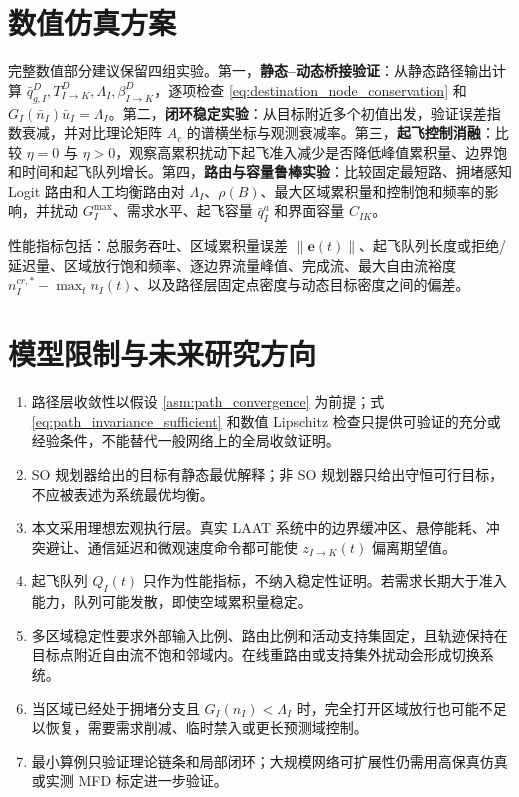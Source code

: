 \documentclass[a4paper,12pt]{article}
\theoremstyle{plain}
\theoremstyle{definition}
\theoremstyle{remark}
\begin{document}
\section{数值仿真方案}

完整数值部分建议保留四组实验。第一，\textbf{静态--动态桥接验证}：从静态路径输出计算 $\bar q_{g,I}^D,T_{I\to K}^D,\Lambda_I,\beta_{I\to K}^D$，逐项检查 \eqref{eq:destination_node_conservation} 和 $G_I(\bar n_I)\bar u_I=\Lambda_I$。第二，\textbf{闭环稳定实验}：从目标附近多个初值出发，验证误差指数衰减，并对比理论矩阵 $A_c$ 的谱横坐标与观测衰减率。第三，\textbf{起飞控制消融}：比较 $\eta=0$ 与 $\eta>0$，观察高累积扰动下起飞准入减少是否降低峰值累积量、边界饱和时间和起飞队列增长。第四，\textbf{路由与容量鲁棒实验}：比较固定最短路、拥堵感知 Logit 路由和人工均衡路由对 $\Lambda_I$、$\rho(B)$、最大区域累积量和控制饱和频率的影响，并扰动 $G_I^{\max}$、需求水平、起飞容量 $\bar q_I^a$ 和界面容量 $C_{IK}$。

性能指标包括：总服务吞吐、区域累积量误差 $\|\bm e(t)\|$、起飞队列长度或拒绝/延迟量、区域放行饱和频率、逐边界流量峰值、完成流、最大自由流裕度 $n_I^{cr,*}-\max_t n_I(t)$、以及路径层固定点密度与动态目标密度之间的偏差。

\section{模型限制与未来研究方向}

\begin{enumerate}
    \item 路径层收敛性以假设 \ref{asm:path_convergence} 为前提；式 \eqref{eq:path_invariance_sufficient} 和数值 Lipschitz 检查只提供可验证的充分或经验条件，不能替代一般网络上的全局收敛证明。
    \item SO 规划器给出的目标有静态最优解释；非 SO 规划器只给出守恒可行目标，不应被表述为系统最优均衡。
    \item 本文采用理想宏观执行层。真实 LAAT 系统中的边界缓冲区、悬停能耗、冲突避让、通信延迟和微观速度命令都可能使 $z_{I\to K}(t)$ 偏离期望值。
    \item 起飞队列 $Q_I(t)$ 只作为性能指标，不纳入稳定性证明。若需求长期大于准入能力，队列可能发散，即使空域累积量稳定。
    \item 多区域稳定性要求外部输入比例、路由比例和活动支持集固定，且轨迹保持在目标点附近自由流不饱和邻域内。在线重路由或支持集外扰动会形成切换系统。
    \item 当区域已经处于拥堵分支且 $G_I(n_I)<\Lambda_I$ 时，完全打开区域放行也可能不足以恢复，需要需求削减、临时禁入或更长预测域控制。
    \item 最小算例只验证理论链条和局部闭环；大规模网络可扩展性仍需用高保真仿真或实测 MFD 标定进一步验证。
\end{enumerate}
\end{document}
